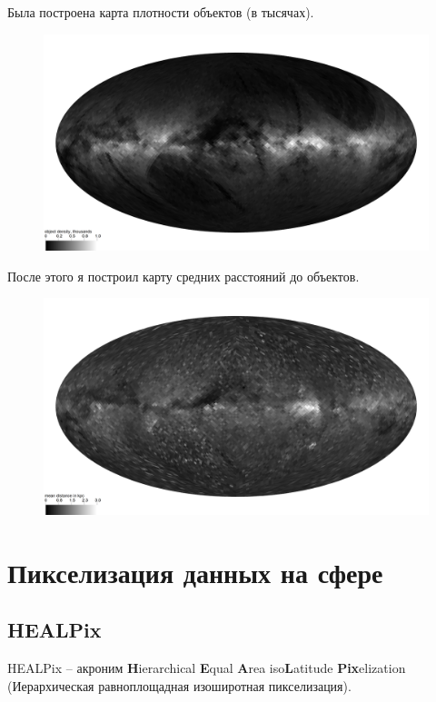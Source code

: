 \documentclass[14pt]{article} %
\begin{document}
Была построена карта плотности объектов (в тысячах).
\begin{figure}[h!]
\includegraphics[width=1\linewidth]{healpdens.jpg}
\end{figure}\newpage

После этого я построил карту средних расстояний до объектов.
\begin{figure}[h!]
\includegraphics[width=1\linewidth]{healpdistmap.jpg}
\end{figure}

\section{Пикселизация данных на сфере}

\subsection{HEALPix}
HEALPix -- акроним \textbf{H}ierarchical \textbf{E}qual \textbf{A}rea iso\textbf{L}atitude \textbf{Pix}elization (Иерархическая равноплощадная изоширотная пикселизация).
\end{document}
